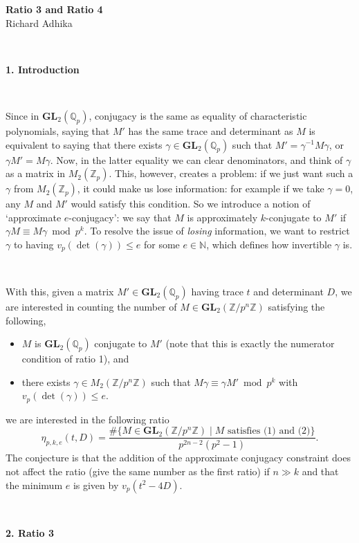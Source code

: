 \documentclass[letterpaper,12pt]{article}
\newcommand{\Z}{\mathbb{Z}}
\newcommand{\N}{\mathbb{N}}
\newcommand{\Q}{\mathbb{Q}}
\newcommand{\GL}{\mathbf {GL}}
\begin{document}
\begin{center}
    {\bf \Huge Ratio 3 and Ratio 4} \\
    Richard Adhika
\end{center}

\

{\bf \LARGE 1. Introduction}

\

Since in $\GL_2(\Q_p)$, conjugacy is the same as equality of characteristic polynomials, saying that $M'$ has the same trace and determinant as $M$ is equivalent to saying that there exists $\gamma\in \GL_2(\Q_p)$ such that 
$M'=\gamma^{-1}M\gamma$, or $\gamma M'=M\gamma$.  
Now, in the latter equality we can clear denominators, and think of $\gamma$ as a matrix in $M_2(\Z_p)$. This, however, creates a problem: 
if we just want such a $\gamma$ from $M_2(\Z_p)$, it could make us lose information: for example if we take $\gamma=0$, any $M$ and $M'$ would satisfy this condition. 
So we introduce a notion of `approximate $e$-conjugacy': 
we say that $M$ is approximately $k$-conjugate to $M'$ if 
$\gamma M \equiv M\gamma\bmod p^k$.
To resolve the issue of \emph{losing} information, we want to restrict $\gamma$ to having 
$v_p(\det(\gamma)) \leq e$ for some $e \in \N$, which defines how invertible $\gamma$ is.

\

With this, given a matrix $M' \in \GL_2(\Q_p)$ having trace $t$ and determinant $D$,
we are interested in counting the number of $M \in \GL_2(\Z / p^n\Z)$ satisfying the following,
\begin{itemize}
\item $M$ is $\GL_2(\Q_p)$ conjugate to $M'$ (note that this is exactly the numerator condition of ratio 1), and
\item there exists $\gamma \in M_2(\Z/p^n\Z)$ such that $M\gamma \equiv \gamma M' \bmod p^k$ with $v_p(\det(\gamma)) \leq e$.
\end{itemize} 
we are interested in the following ratio
\[
\eta_{p, k, e}(t, D) = 
\frac{\#\{M \in \GL_2(\Z / p^n\Z) \; | \; M \text{ satisfies (1) and (2)} \}}{p^{2n-2}(p^2-1)}.
\]
The conjecture is that the addition of the approximate conjugacy constraint does not affect
the ratio (give the same number as the first ratio) if $n \gg k$ 
and that the minimum $e$ is given by $v_p(t^2 - 4D)$.

\

{\bf \LARGE 2. Ratio 3}

\
\end{document}
